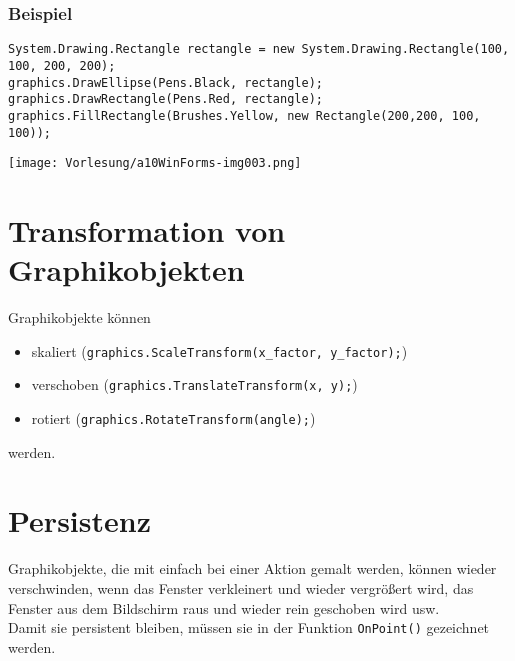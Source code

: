 \subsubsection*{Beispiel}
\begin{lstlisting}[language={[Sharp]C}]
System.Drawing.Rectangle rectangle = new System.Drawing.Rectangle(100, 100, 200, 200);
graphics.DrawEllipse(Pens.Black, rectangle);
graphics.DrawRectangle(Pens.Red, rectangle);
graphics.FillRectangle(Brushes.Yellow, new Rectangle(200,200, 100, 100));
\end{lstlisting}
\begin{center}
\texttt{[image: Vorlesung/a10WinForms-img003.png]}
\end{center} 

\section{Transformation von Graphikobjekten}
Graphikobjekte können
\begin{itemize}
\item skaliert  (\lstinline$graphics.ScaleTransform(x_factor, y_factor);$)
\item verschoben (\lstinline$graphics.TranslateTransform(x, y);$)
\item rotiert  (\lstinline$graphics.RotateTransform(angle);$)
\end{itemize}
werden.

\section{Persistenz}
Graphikobjekte, die mit einfach bei einer Aktion gemalt werden, können wieder verschwinden, wenn das Fenster verkleinert und wieder vergrößert wird, das Fenster aus dem Bildschirm raus und wieder rein geschoben wird usw.\\
Damit sie persistent bleiben, müssen sie in der Funktion \lstinline`OnPoint()` gezeichnet werden.